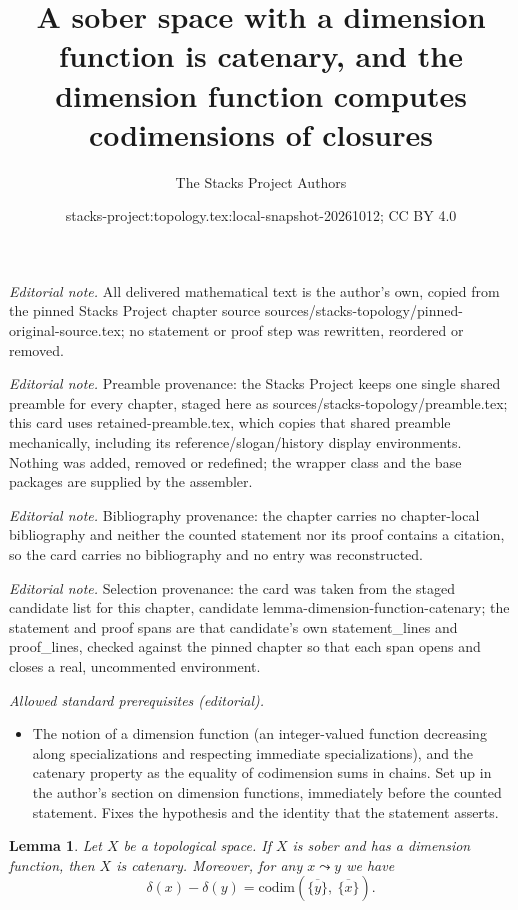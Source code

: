 \documentclass[10pt,a4paper]{amsart}
\title{A sober space with a dimension function is catenary, and the dimension function computes codimensions of closures}
\author{The Stacks Project Authors}
\date{stacks-project:topology.tex:local-snapshot-20261012; CC BY 4.0}
\theoremstyle{plain}
\newtheorem{lemma}[subsection]{Lemma}
\theoremstyle{definition}
\theoremstyle{remark}
\numberwithin{equation}{subsection}
\begin{document}
\maketitle
\noindent\textit{Editorial note.} All delivered mathematical text is the author's own, copied from the pinned Stacks Project chapter source sources/stacks-topology/pinned-original-source.tex; no statement or proof step was rewritten, reordered or removed.\par\medskip
\noindent\textit{Editorial note.} Preamble provenance: the Stacks Project keeps one single shared preamble for every chapter, staged here as sources/stacks-topology/preamble.tex; this card uses retained-preamble.tex, which copies that shared preamble mechanically, including its reference/slogan/history display environments. Nothing was added, removed or redefined; the wrapper class and the base packages are supplied by the assembler.\par\medskip
\noindent\textit{Editorial note.} Bibliography provenance: the chapter carries no chapter-local bibliography and neither the counted statement nor its proof contains a citation, so the card carries no bibliography and no entry was reconstructed.\par\medskip
\noindent\textit{Editorial note.} Selection provenance: the card was taken from the staged candidate list for this chapter, candidate lemma-dimension-function-catenary; the statement and proof spans are that candidate's own statement\_lines and proof\_lines, checked against the pinned chapter so that each span opens and closes a real, uncommented environment.\par\medskip
\noindent\textit{Allowed standard prerequisites (editorial).}\begin{itemize}
\item The notion of a dimension function (an integer-valued function decreasing along specializations and respecting immediate specializations), and the catenary property as the equality of codimension sums in chains. Set up in the author's section on dimension functions, immediately before the counted statement. Fixes the hypothesis and the identity that the statement asserts.
\end{itemize}\medskip
\begin{lemma}
\label{lemma-dimension-function-catenary}
Let $X$ be a topological space. If $X$ is sober and has a dimension
function, then $X$ is catenary. Moreover, for any $x \leadsto y$
we have
$$
\delta(x) - \delta(y) =
\text{codim}\left(\overline{\{y\}}, \ \overline{\{x\}}\right).
$$
\end{lemma}
\end{document}
